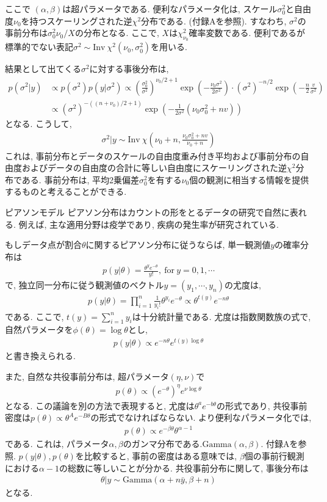 \documentclass[10pt,dvipdfmx,a4]{beamer}
\newcommand{\eqn}[1]{\begin{align*}#1\end{align*}}
\begin{document}

\begin{frame}
ここで $(\alpha,\beta)$は超パラメータである.
便利なパラメータ化は, スケール$\sigma_0^2$と自由度$\nu_0$を持つスケーリングされた逆$\chi^2$分布である.
(付録Aを参照).
すなわち, $\sigma^2$の事前分布は$\sigma_0^2 \nu_0 / X$の分布となる.
ここで, $X$は$\chi_{\nu_0}^2$確率変数である.
便利であるが標準的でない表記$\sigma^2\sim \text{Inv}\ \chi^2(\nu_0,\sigma_0^2)$を用いる.

結果として出てくる$\sigma^2$に対する事後分布は,
\eqn{p(\sigma^2|y)&\propto p(\sigma^2)p(y|\sigma^2)
\propto \left(\frac{\sigma_0^2}{\sigma^2}\right)^{\nu_0/2+1} \exp\left(-\frac{\nu_0\sigma^2}{2\sigma^2}\right)\cdot (\sigma^2)^{-n/2}\exp \left(-\frac{n}{2}\frac{v}{\sigma^2}\right)\\
&\propto (\sigma^2)^{-((n+\nu_0)/2+1)} \exp\left(-\frac{1}{2\sigma^2} (\nu_0\sigma_0^2+nv)\right)}
となる.
こうして,
\eqn{\sigma^2|y\sim \text{Inv}\ \chi\left(\nu_0+n,\frac{\nu_0\sigma_0^2+nv}{\nu_0+n}\right)}
これは, 事前分布とデータのスケールの自由度重み付き平均および事前分布の自由度およびデータの自由度の合計に等しい自由度にスケーリングされた逆$\chi^2$分布である.
事前分布は, 平均2乗偏差$\sigma^2_0$を有する$\nu_0$個の観測に相当する情報を提供するものと考えることができる.
\end{frame}


\begin{frame}{ピアソンモデル}
ピアソン分布はカウントの形をとるデータの研究で自然に表れる.
例えば, 主な適用分野は疫学であり, 疾病の発生率が研究されている.

もしデータ点が割合$\theta$に関するピアソン分布に従うならば, 単一観測値$y$の確率分布は
\eqn{p(y|\theta)=\frac{\theta^ye^{-\theta}}{y!},\ \text{for}\ y=0,1,\cdots}
で, 独立同一分布に従う観測値のベクトル$y=(y_1,\cdots,y_n)$の尤度は,
\eqn{p(y|\theta)=\prod_{i=1}^n\frac{1}{y_i!}\theta^{y_i}e^{-\theta}\propto \theta^{t(y)}e^{-n\theta}}
である.
ここで, $t(y)=\sum_{i=1}^n y_i$は十分統計量である.
尤度は指数関数族の式で, 自然パラメータを$\phi(\theta)=\log \theta$とし,
\eqn{p(y|\theta)\propto e^{-n\theta}e^{t(y)\log \theta}}
と書き換えられる.
\end{frame}


\begin{frame}
また, 自然な共役事前分布は, 超パラメータ$(\eta,\nu)$で
\eqn{p(\theta)\propto (e^{-\theta})^{\eta}e^{\nu \log \theta}}
となる.
この議論を別の方法で表現すると, 尤度は$\theta^ae^{-b\theta}$の形式であり, 共役事前密度は$p(\theta)\propto\theta^Ae^{-B \theta}$の形式でなければならない.
より便利なパラメータ化では,
\eqn{p(\theta)\propto e^{-\beta\theta}\theta^{\alpha-1}}
である.
これは, パラメータ$\alpha, \beta$のガンマ分布である.$\text{Gamma}(\alpha,\beta)$.
付録Aを参照.
$p(y|\theta), p(\theta)$を比較すると, 事前の密度はある意味では, $\beta$個の事前行観測における$\alpha-1$の総数に等しいことが分かる.
共役事前分布に関して, 事後分布は
\eqn{\theta|y\sim \text{Gamma}(\alpha+n\bar{y},\beta+n)}
となる.
\end{frame}
\end{document}
